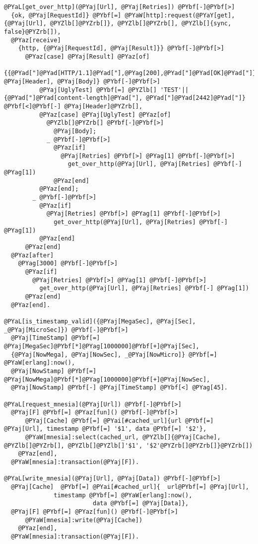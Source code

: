 \begin{Verbatim}[commandchars=@\[\]]
@PYaL[get_over_http](@PYaj[Url], @PYaj[Retries]) @PYbf[-]@PYbf[>]
  {ok, @PYaj[RequestId]} @PYbf[=] @PYaW[http]:request(@PYaY[get], {@PYaj[Url], @PYZlb[]@PYZrb[]}, @PYZlb[]@PYZrb[], @PYZlb[]{sync, false}@PYZrb[]),
  @PYaz[receive]
    {http, {@PYaj[RequestId], @PYaj[Result]}} @PYbf[-]@PYbf[>]
      @PYaz[case] @PYaj[Result] @PYaz[of]
        {{@PYad["]@PYad[HTTP/1.1]@PYad["],@PYag[200],@PYad["]@PYad[OK]@PYad["]}, @PYaj[Header], @PYaj[Body]} @PYbf[-]@PYbf[>]
          @PYaj[UglyTest] @PYbf[=] @PYZlb[] 'TEST'|| {@PYad["]@PYad[content-length]@PYad["], @PYad["]@PYad[2442]@PYad["]} @PYbf[<]@PYbf[-] @PYaj[Header]@PYZrb[],
          @PYaz[case] @PYaj[UglyTest] @PYaz[of]
            @PYZlb[]@PYZrb[] @PYbf[-]@PYbf[>]
              @PYaj[Body];
            _ @PYbf[-]@PYbf[>]
              @PYaz[if]
                @PYaj[Retries] @PYbf[>] @PYag[1] @PYbf[-]@PYbf[>]
                  get_over_http(@PYaj[Url], @PYaj[Retries] @PYbf[-] @PYag[1])
              @PYaz[end]
          @PYaz[end];
        _ @PYbf[-]@PYbf[>]
          @PYaz[if]
            @PYaj[Retries] @PYbf[>] @PYag[1] @PYbf[-]@PYbf[>]
              get_over_http(@PYaj[Url], @PYaj[Retries] @PYbf[-] @PYag[1])
          @PYaz[end]
      @PYaz[end]
  @PYaz[after]
    @PYag[3000] @PYbf[-]@PYbf[>]
      @PYaz[if]
        @PYaj[Retries] @PYbf[>] @PYag[1] @PYbf[-]@PYbf[>]
          get_over_http(@PYaj[Url], @PYaj[Retries] @PYbf[-] @PYag[1])
      @PYaz[end]
  @PYaz[end].

@PYaL[is_timestamp_valid]({@PYaj[MegaSec], @PYaj[Sec], _@PYaj[MicroSec]}) @PYbf[-]@PYbf[>]
  @PYaj[TimeStamp] @PYbf[=] @PYaj[MegaSec]@PYbf[*]@PYag[1000000]@PYbf[+]@PYaj[Sec],
  {@PYaj[NowMega], @PYaj[NowSec], _@PYaj[NowMicro]} @PYbf[=] @PYaW[erlang]:now(),
  @PYaj[NowStamp] @PYbf[=] @PYaj[NowMega]@PYbf[*]@PYag[1000000]@PYbf[+]@PYaj[NowSec],
  @PYaj[NowStamp] @PYbf[-] @PYaj[TimeStamp] @PYbf[<] @PYag[45].

@PYaL[request_mnesia](@PYaj[Url]) @PYbf[-]@PYbf[>]
  @PYaj[F] @PYbf[=] @PYaz[fun]() @PYbf[-]@PYbf[>]
      @PYaj[Cache] @PYbf[=] @PYai[#cached_url]{url @PYbf[=] @PYaj[Url], timestamp @PYbf[=] '$1', data @PYbf[=] '$2'},
      @PYaW[mnesia]:select(cached_url, @PYZlb[]{@PYaj[Cache], @PYZlb[]@PYZrb[], @PYZlb[]@PYZlb[]'$1', '$2'@PYZrb[]@PYZrb[]}@PYZrb[])
    @PYaz[end],
  @PYaW[mnesia]:transaction(@PYaj[F]).
  
@PYaL[write_mnesia](@PYaj[Url], @PYaj[Data]) @PYbf[-]@PYbf[>]
  @PYaj[Cache]  @PYbf[=] @PYai[#cached_url]{  url@PYbf[=] @PYaj[Url],
              timestamp @PYbf[=] @PYaW[erlang]:now(),
                         data @PYbf[=] @PYaj[Data]},
  @PYaj[F] @PYbf[=] @PYaz[fun]() @PYbf[-]@PYbf[>]
      @PYaW[mnesia]:write(@PYaj[Cache])
    @PYaz[end],
  @PYaW[mnesia]:transaction(@PYaj[F]).
\end{Verbatim}
